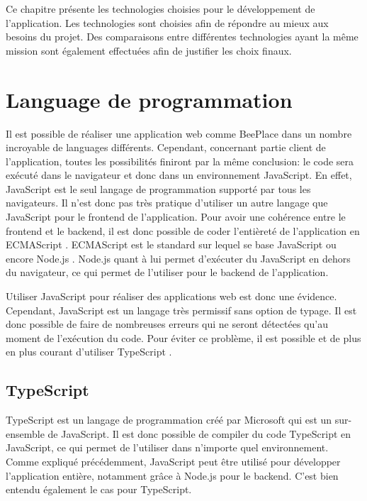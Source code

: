 Ce chapitre présente les technologies choisies pour le développement de l'application. Les technologies sont choisies afin de répondre au mieux aux besoins du projet. Des comparaisons entre différentes technologies ayant la même mission sont également effectuées afin de justifier les choix finaux.

\section{Language de programmation}

Il est possible de réaliser une application web comme BeePlace dans un nombre incroyable de languages différents. Cependant, concernant partie client de l'application, toutes les possibilités finiront par la même conclusion: le code sera exécuté dans le navigateur et donc dans un environnement JavaScript. En effet, JavaScript est le seul langage de programmation supporté par tous les navigateurs. Il n'est donc pas très pratique d'utiliser un autre langage que JavaScript pour le frontend de l'application. Pour avoir une cohérence entre le frontend et le backend, il est donc possible de coder l'entièreté de l'application en ECMAScript \cite{ecmascript}. ECMAScript est le standard sur lequel se base JavaScript ou encore Node.js \cite{nodejs}. Node.js quant à lui permet d'exécuter du JavaScript en dehors du navigateur, ce qui permet de l'utiliser pour le backend de l'application.

Utiliser JavaScript pour réaliser des applications web est donc une évidence. Cependant, JavaScript est un langage très permissif sans option de typage. Il est donc possible de faire de nombreuses erreurs qui ne seront détectées qu'au moment de l'exécution du code. Pour éviter ce problème, il est possible et de plus en plus courant d'utiliser TypeScript \cite{typescript}.

\subsection{TypeScript}

TypeScript est un langage de programmation créé par Microsoft qui est un sur-ensemble de JavaScript. Il est donc possible de compiler du code TypeScript en JavaScript, ce qui permet de l'utiliser dans n'importe quel environnement. Comme expliqué précédemment, JavaScript peut être utilisé pour développer l'application entière, notamment grâce à Node.js pour le backend. C'est bien entendu également le cas pour TypeScript.

